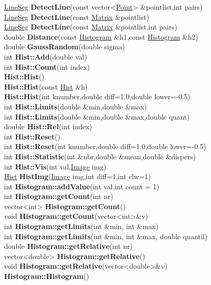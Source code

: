 \documentclass[10pt,titlepage]{article}
\def\functionlistentry#1#2#3#4#5#6{\noindent #1 {\bf #2}(#3) \dotfill #6\\}
\begin{document}
{{\functionlistentry{\hyperlink{LineSeg}{LineSeg}}{DetectLine}{const vector<\hyperlink{Point}{Point}> \&pointlist,int pairs}{934}{statistics}{}
\functionlistentry{\hyperlink{LineSeg}{LineSeg}}{DetectLine}{const \hyperlink{Matrix}{Matrix} \&pointlist}{935}{statistics}{}
\functionlistentry{\hyperlink{LineSeg}{LineSeg}}{DetectLine}{const \hyperlink{Matrix}{Matrix} \&pointlist,int pairs}{936}{statistics}{}
\functionlistentry{double}{Distance}{const \hyperlink{Histogram}{Histogram} \&h1,const \hyperlink{Histogram}{Histogram} \&h2}{900}{statistics}{}
\functionlistentry{double}{GaussRandom}{double sigma}{862}{statistics}{}
\functionlistentry{int}{Hist::Add}{double val}{908}{statistics}{}
\functionlistentry{int}{Hist::Count}{int index}{909}{statistics}{}
\functionlistentry{}{Hist::Hist}{}{903}{statistics}{}
\functionlistentry{}{Hist::Hist}{const \hyperlink{Hist}{Hist} \&h}{904}{statistics}{}
\functionlistentry{}{Hist::Hist}{int knumber,double diff=1.0,double lower=-0.5}{905}{statistics}{}
\functionlistentry{int}{Hist::Limits}{double \&min,double \&max}{911}{statistics}{}
\functionlistentry{int}{Hist::Limits}{double \&min,double \&max,double quant}{912}{statistics}{}
\functionlistentry{double}{Hist::Rel}{int index}{910}{statistics}{}
\functionlistentry{int}{Hist::Reset}{}{906}{statistics}{}
\functionlistentry{int}{Hist::Reset}{int knumber,double diff=1.0,double lower=-0.5}{907}{statistics}{}
\functionlistentry{int}{Hist::Statistic}{int \&nbr,double \&mean,double \&dispers}{914}{statistics}{}
\functionlistentry{int}{Hist::Vis}{int val,\hyperlink{Image}{Image} img}{916}{statistics}{}
\functionlistentry{\hyperlink{Hist}{Hist}}{HistImg}{\hyperlink{Image}{Image} img,int diff=1,int clw=1}{913}{statistics}{}
\functionlistentry{int}{Histogram::addValue}{int val,int count = 1}{887}{statistics}{}
\functionlistentry{int}{Histogram::getCount}{int nr}{888}{statistics}{}
\functionlistentry{vector\textless {}int\textgreater }{Histogram::getCount}{}{890}{statistics}{}
\functionlistentry{void}{Histogram::getCount}{vector\textless {}int\textgreater  \&v}{891}{statistics}{}
\functionlistentry{int}{Histogram::getLimits}{int \&min, int \&max}{895}{statistics}{}
\functionlistentry{int}{Histogram::getLimits}{int \&min, int \&max, double quantil}{896}{statistics}{}
\functionlistentry{double}{Histogram::getRelative}{int nr}{892}{statistics}{}
\functionlistentry{vector\textless {}double\textgreater }{Histogram::getRelative}{}{893}{statistics}{}
\functionlistentry{void}{Histogram::getRelative}{vector\textless {}double\textgreater  \&v}{894}{statistics}{}
\functionlistentry{}{Histogram::Histogram}{}{880}{statistics}{}
}}
\end{document}
